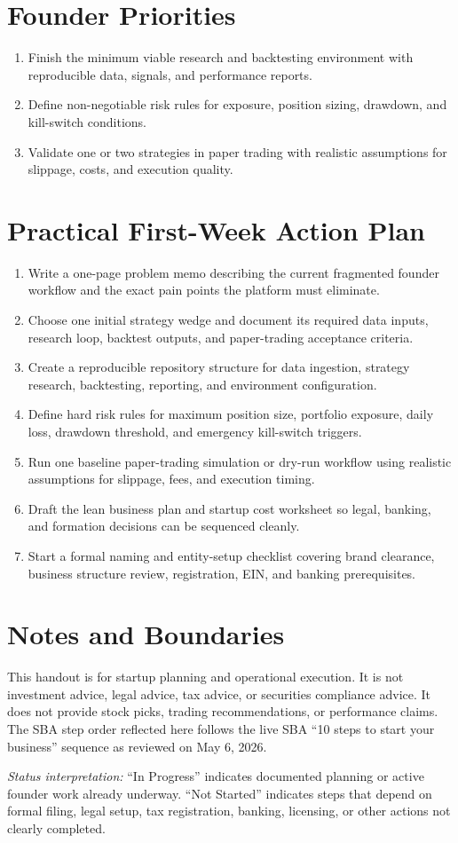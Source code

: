 \documentclass[11pt]{article}
\begin{document}
\section*{Founder Priorities}
\begin{enumerate}[leftmargin=1.5em,itemsep=3pt]
    \item Finish the minimum viable research and backtesting environment with reproducible data, signals, and performance reports.
    \item Define non-negotiable risk rules for exposure, position sizing, drawdown, and kill-switch conditions.
    \item Validate one or two strategies in paper trading with realistic assumptions for slippage, costs, and execution quality.
\end{enumerate}

\section*{Practical First-Week Action Plan}
\begin{enumerate}[leftmargin=1.5em,itemsep=3pt]
    \item Write a one-page problem memo describing the current fragmented founder workflow and the exact pain points the platform must eliminate.
    \item Choose one initial strategy wedge and document its required data inputs, research loop, backtest outputs, and paper-trading acceptance criteria.
    \item Create a reproducible repository structure for data ingestion, strategy research, backtesting, reporting, and environment configuration.
    \item Define hard risk rules for maximum position size, portfolio exposure, daily loss, drawdown threshold, and emergency kill-switch triggers.
    \item Run one baseline paper-trading simulation or dry-run workflow using realistic assumptions for slippage, fees, and execution timing.
    \item Draft the lean business plan and startup cost worksheet so legal, banking, and formation decisions can be sequenced cleanly.
    \item Start a formal naming and entity-setup checklist covering brand clearance, business structure review, registration, EIN, and banking prerequisites.
\end{enumerate}

\section*{Notes and Boundaries}
This handout is for startup planning and operational execution. It is not investment advice, legal advice, tax advice, or securities compliance advice. It does not provide stock picks, trading recommendations, or performance claims. The SBA step order reflected here follows the live SBA ``10 steps to start your business'' sequence as reviewed on May 6, 2026.

\vfill
{\footnotesize\textit{Status interpretation:} ``In Progress'' indicates documented planning or active founder work already underway. ``Not Started'' indicates steps that depend on formal filing, legal setup, tax registration, banking, licensing, or other actions not clearly completed.}
\end{document}
